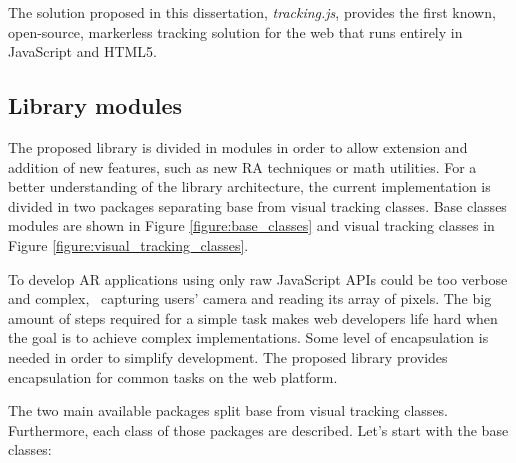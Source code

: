 The solution proposed in this dissertation, \textit{tracking.js}, provides the first known, open-source, markerless tracking solution for the web that runs entirely in JavaScript and HTML5.


\subsection{Library modules} %
\label{sub:tracking_library_for_the_web:library_modules}

The proposed library is divided in modules in order to allow extension and addition of new features, such as new RA techniques or math utilities. For a better understanding of the library architecture, the current implementation is divided in two packages separating base from visual tracking classes. Base classes modules are shown in Figure \ref{figure:base_classes} and visual tracking classes in Figure \ref{figure:visual_tracking_classes}.

To develop AR applications using only raw JavaScript APIs \cite{MDN2013} could be too verbose and complex, \eg\ capturing users' camera and reading its array of pixels. The big amount of steps required for a simple task makes web developers life hard when the goal is to achieve complex implementations. Some level of encapsulation is needed in order to simplify development. The proposed library provides encapsulation for common tasks on the web platform.

The two main available packages split base from visual tracking classes. Furthermore, each class of those packages are described. Let's start with the base classes:

